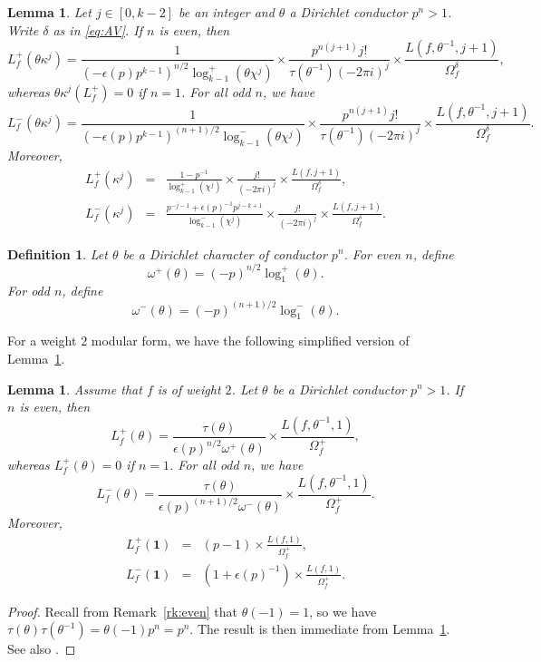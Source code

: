 \documentclass{amsart}
\newtheorem{lemma}[theorem]{Lemma}
\newtheorem{definition}[theorem]{Definition}
\begin{document}
\begin{lemma}\label{lem:inter}
Let $j\in[0,k-2]$ be an integer and $\theta$ a Dirichlet conductor $p^n>1$. Write $\delta$ as in \eqref{eq:AV}. If $n$ is even, then
\[
L_f^+(\theta\kappa^j)=\frac{1}{(-\epsilon(p)p^{k-1})^{n/2}\log_{k-1}^+(\theta\chi^j)}\times\frac{p^{n(j+1)}j!}{\tau(\theta^{-1})(-2\pi i)^j}\times\frac{L(f,\theta^{-1},j+1)}{\Omega_f^\delta},
\]
whereas $\theta\kappa^j(L_f^+)=0$ if $n=1$. For all odd $n$, we have
\[
L_f^-(\theta\kappa^j)=\frac{1}{(-\epsilon(p)p^{k-1})^{(n+1)/2}\log_{k-1}^-(\theta\chi^j)}\times\frac{p^{n(j+1)}j!}{\tau(\theta^{-1})(-2\pi i)^j}\times\frac{L(f,\theta^{-1},j+1)}{\Omega_f^\delta}.
\]
Moreover,
\begin{eqnarray*}
L_f^+(\kappa^j)&=&\frac{1-p^{-1}}{\log_{k-1}^+(\chi^j)}\times\frac{j!}{(-2\pi i)^j}\times\frac{L(f,j+1)}{\Omega_f^\delta},\\
L_f^-(\kappa^j)&=&\frac{p^{-j-1}+\epsilon(p)^{-1}p^{j-k+1}}{\log_{k-1}^-(\chi^j)}\times\frac{j!}{(-2\pi i)^j}\times\frac{L(f,j+1)}{\Omega_f^\delta}.
\end{eqnarray*}
\end{lemma}

\begin{definition}\label{def:polfactor}
Let $\theta$ be a Dirichlet character of conductor $p^n$. For even $n$, define 
\[
\omega^+(\theta)=(-p)^{n/2}\log_{1}^+(\theta).
\]
For odd $n$, define
\[
\omega^-(\theta)=(-p)^{(n+1)/2}\log_{1}^-(\theta).
\]
\end{definition}
For a weight $2$ modular form, we have the following simplified version of Lemma~\ref{lem:inter}.
\begin{lemma}\label{lem:inter2}
Assume that $f$ is of weight $2$. Let $\theta$  be a Dirichlet conductor $p^n>1$.  If $n$ is even, then
\[
L_f^+(\theta)=\frac{\tau(\theta)}{\epsilon(p)^{n/2}\omega^+(\theta)}\times\frac{L(f,\theta^{-1},1)}{\Omega_f^+},
\]
whereas $L_f^+(\theta)=0$ if $n=1$. For all odd $n$, we have
\[
L_f^-(\theta)=\frac{\tau(\theta)}{\epsilon(p)^{(n+1)/2}\omega^-(\theta)}\times\frac{L(f,\theta^{-1},1)}{\Omega_f^+}.
\]
Moreover,
\begin{eqnarray*}
L_f^+(\mathbf{1})&=&(p-1)\times\frac{L(f,1)}{\Omega_f^+},\\
L_f^-(\mathbf{1})&=&(1+\epsilon(p)^{-1})\times\frac{L(f,1)}{\Omega_f^+}.
\end{eqnarray*}
\end{lemma}
\begin{proof}
Recall from Remark~\ref{rk:even} that $\theta(-1)=1$, so we have $\tau(\theta)\tau(\theta^{-1})=\theta(-1)p^n=p^n$. The result is then immediate from Lemma~\ref{lem:inter}. See also \cite[(3.4)-(3.7)]{kobayashi03}.
\end{proof}
\end{document}
